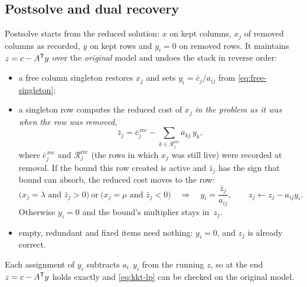 \subsection{Postsolve and dual recovery}
Postsolve starts from the reduced solution: $x$ on kept columns, $x_j$ of removed columns as
recorded, $y$ on kept rows and $y_i=0$ on removed rows. It maintains $z=c-A^{\mathsf{T}} y$ over the
\emph{original} model and undoes the stack in reverse order:
\begin{itemize}
  \item a free column singleton restores $x_j$ and sets $y_i=\bar c_j/a_{ij}$ from \eqref{eq:free-singleton};
  \item a singleton row computes the reduced cost of $x_j$ \emph{in the problem as it was when
    the row was removed},
    \begin{equation}\label{eq:zbar}
      \bar z_j = \bar c_j^{\,\text{rec}} - \sum_{k\in\mathcal{R}_j^{\text{rec}}} a_{kj}\,y_k ,
    \end{equation}
    where $\bar c_j^{\,\text{rec}}$ and $\mathcal{R}_j^{\text{rec}}$ (the rows in which $x_j$ was
    still live) were recorded at removal. If the bound this row created is active and $\bar z_j$
    has the sign that bound can absorb, the reduced cost moves to the row:
    \begin{equation}\label{eq:singleton-dual}
      \bigl(x_j=\lambda \text{ and } \bar z_j>0\bigr)\ \text{or}\ \bigl(x_j=\mu\text{ and }\bar z_j<0\bigr)
      \quad\Longrightarrow\quad y_i = \frac{\bar z_j}{a_{ij}},\qquad z_j\leftarrow z_j - a_{ij}y_i .
    \end{equation}
    Otherwise $y_i=0$ and the bound's multiplier stays in~$z_j$.
  \item empty, redundant and fixed items need nothing: $y_i=0$, and $z_j$ is already correct.
\end{itemize}
Each assignment of $y_i$ subtracts $a_{i\cdot}y_i$ from the running $z$, so at the end
$z=c-A^{\mathsf{T}} y$ holds exactly and \eqref{eq:kkt-lp} can be checked on the original model.

